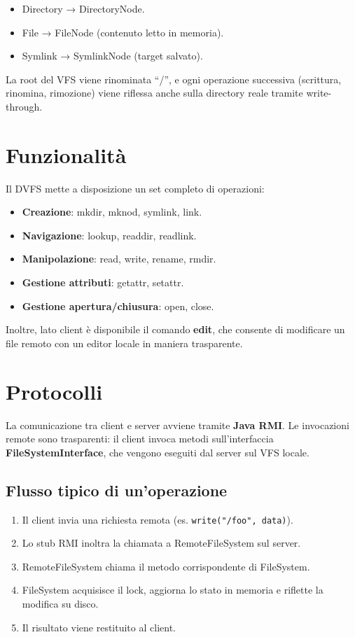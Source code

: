 \documentclass[11pt]{article}
\begin{document}
\begin{itemize}
\item Directory → DirectoryNode.
\item File → FileNode (contenuto letto in memoria).
\item Symlink → SymlinkNode (target salvato).
\end{itemize}

La root del VFS viene rinominata “/”, e ogni operazione successiva (scrittura, rinomina, rimozione) viene riflessa anche sulla directory reale tramite write-through.  
\section{Funzionalità}
\label{sec:org67798ae}
Il DVFS mette a disposizione un set completo di operazioni:  

\begin{itemize}
\item \textbf{Creazione}: mkdir, mknod, symlink, link.
\item \textbf{Navigazione}: lookup, readdir, readlink.
\item \textbf{Manipolazione}: read, write, rename, rmdir.
\item \textbf{Gestione attributi}: getattr, setattr.
\item \textbf{Gestione apertura/chiusura}: open, close.
\end{itemize}

Inoltre, lato client è disponibile il comando \textbf{edit}, che consente di modificare un file remoto con un editor locale in maniera trasparente.  
\section{Protocolli}
\label{sec:org151bc62}
La comunicazione tra client e server avviene tramite \textbf{Java RMI}.  
Le invocazioni remote sono trasparenti: il client invoca metodi sull’interfaccia \textbf{FileSystemInterface}, che vengono eseguiti dal server sul VFS locale.  
\subsection{Flusso tipico di un’operazione}
\label{sec:orgd02ae1e}
\begin{enumerate}
\item Il client invia una richiesta remota (es. \texttt{write("/foo", data)}).
\item Lo stub RMI inoltra la chiamata a RemoteFileSystem sul server.
\item RemoteFileSystem chiama il metodo corrispondente di FileSystem.
\item FileSystem acquisisce il lock, aggiorna lo stato in memoria e riflette la modifica su disco.
\item Il risultato viene restituito al client.
\end{enumerate}
\end{document}
